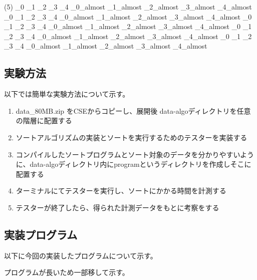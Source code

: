\documentclass[a4j,dvipdfmx]{jsreport}
\begin{document}
\begin{tasks}(5)
\_0
\_1
\_2
\_3
\_4
\_0\_almost
\_1\_almost
\_2\_almost
\_3\_almost
\_4\_almost
\_0
\_1
\_2
\_3
\_4
\_0\_almost
\_1\_almost
\_2\_almost
\_3\_almost
\_4\_almost
\_0
\_1
\_2
\_3
\_4
\_0\_almost
\_1\_almost
\_2\_almost
\_3\_almost
\_4\_almost
\_0
\_1
\_2
\_3
\_4
\_0\_almost
\_1\_almost
\_2\_almost
\_3\_almost
\_4\_almost
\_0
\_1
\_2
\_3
\_4
\_0\_almost
\_1\_almost
\_2\_almost
\_3\_almost
\_4\_almost
\end{tasks}

\newpage
\subsection{実験方法}
以下では簡単な実験方法について示す。
\begin{enumerate}
\item data\_80MB.zip をCSEからコピーし、展開後 data-algoディレクトリを任意の階層に配置する
\item ソートアルゴリズムの実装とソートを実行するためのテスターを実装する
\item コンパイルしたソートプログラムとソート対象のデータを分かりやすいように、data-algoディレクトリ内にprogramというディレクトリを作成しそこに配置する
\item ターミナルにてテスターを実行し、ソートにかかる時間を計測する
\item テスターが終了したら、得られた計測データをもとに考察をする
\end{enumerate}

\subsection{実装プログラム}
以下に今回の実装したプログラムについて示す。\par
プログラムが長いため一部移して示す。
\end{document}
